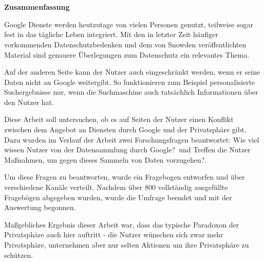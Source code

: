 %
% 

\chapter*{\ }


\begin{center}
	\begin{large}
		\textbf{Zusammenfassung}
	\end{large}
\end{center}
\vspace{0.75em}
Google Dienste werden heutzutage von vielen Personen genutzt, teilweise sogar fest in das tägliche Leben integriert. 
Mit den in letzter Zeit häufiger vorkommenden Datenschutzbedenken und dem von Snowden veröffentlichten Material sind genauere Überlegungen zum Datenschutz ein relevantes Thema.

Auf der anderen Seite kann der Nutzer auch eingeschränkt werden, wenn er seine Daten nicht an Google weitergibt. So funktionieren zum Beispiel personalisierte Suchergebnisse nur, wenn die Suchmaschine auch tatsächlich Informationen über den Nutzer hat.

Diese Arbeit soll untersuchen, ob es auf Seiten der Nutzer einen Konflikt zwischen dem Angebot an Diensten durch Google und der Privatsphäre gibt. Dazu wurden im Verlauf der Arbeit zwei Forschungsfragen beantwortet: \glqq Wie viel wissen Nutzer von der Datensammlung durch Google?\grqq\ und \glqq Treffen die Nutzer Maßnahmen, um gegen dieses Sammeln von Daten vorzugehen?\grqq .

Um diese Fragen zu beantworten, wurde ein Fragebogen entworfen und über verschiedene Kanäle verteilt. Nachdem über 800 vollständig ausgefüllte Fragebögen abgegeben wurden, wurde die Umfrage beendet und mit der Auswertung begonnen. 

Maßgebliches Ergebnis dieser Arbeit war, dass das typische Paradoxon der Privatsphäre auch hier auftritt - die Nutzer wünschen sich zwar mehr Privatsphäre, unternehmen aber nur selten Aktionen um ihre Privatsphäre zu schützen.

\chapter*{\ }

